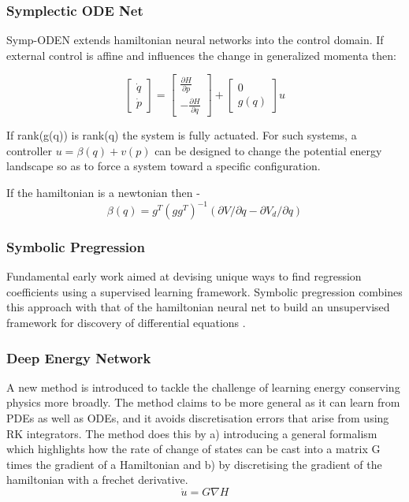 \documentclass{article}
\begin{document}
\subsubsection*{Symplectic ODE Net}

Symp-ODEN \cite{zhong_symplectic_2019} extends hamiltonian neural networks into the control domain. If external control is affine and influences the change in generalized momenta then:

$$ 
\begin{bmatrix}
\dot{q} \\
\dot{p}
\end{bmatrix}
= 
\begin{bmatrix}
\frac{\partial H}{\partial p} \\
-\frac{\partial H}{\partial q}
\end{bmatrix}
+
\begin{bmatrix}
0 \\
g(q)
\end{bmatrix} u
$$

If rank(g(q)) is rank(q) the system is fully actuated. For such systems, a controller $u = \beta(q) +v(p) $ can be designed to change the potential energy landscape so as to force a system toward a specific configuration.

If the hamiltonian is a newtonian then - $$ \beta(q) = g^T (gg^T)^{-1} (\partial V/\partial q - \partial V_d/\partial q) $$

\subsubsection*{Symbolic Pregression}

Fundamental early work aimed at devising unique ways to find regression coefficients using a supervised learning framework. Symbolic pregression combines this approach with that of the hamiltonian neural net to build an unsupervised framework for discovery of differential equations \cite{udrescu_symbolic_2020}.

\subsubsection*{Deep Energy Network}

A new method is introduced to tackle the challenge of learning energy conserving physics more broadly. The method claims to be more general as it can learn from PDEs as well as ODEs, and it avoids discretisation errors that arise from using RK integrators. The method does this by a) introducing a general formalism which highlights how the rate of change of states can be cast into a matrix G times the gradient of a Hamiltonian and b) by discretising the gradient of the hamiltonian with a frechet derivative. 
$$ \dot{u} = G\nabla H $$
 
\end{document}
